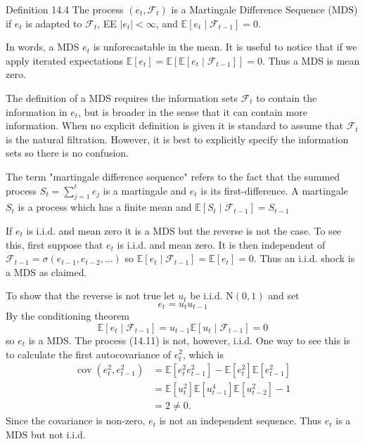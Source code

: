 \documentclass[10pt]{article}
\begin{document}
Definition 14.4 The process $\left(e_{t}, \mathscr{F}_{t}\right)$ is a Martingale Difference Sequence (MDS) if $e_{t}$ is adapted to $\mathscr{F}_{t}$, EE $\left|e_{t}\right|<\infty$, and $\mathbb{E}\left[e_{t} \mid \mathscr{F}_{t-1}\right]=0$.

In words, a MDS $e_{t}$ is unforecastable in the mean. It is useful to notice that if we apply iterated expectations $\mathbb{E}\left[e_{t}\right]=\mathbb{E}\left[\mathbb{E}\left[e_{t} \mid \mathscr{F}_{t-1}\right]\right]=0$. Thus a MDS is mean zero.

The definition of a MDS requires the information sets $\mathscr{F}_{t}$ to contain the information in $e_{t}$, but is broader in the sense that it can contain more information. When no explicit definition is given it is standard to assume that $\mathscr{F}_{t}$ is the natural filtration. However, it is best to explicitly specify the information sets so there is no confusion.

The term "martingale difference sequence" refers to the fact that the summed process $S_{t}=\sum_{j=1}^{t} e_{j}$ is a martingale and $e_{t}$ is its first-difference. A martingale $S_{t}$ is a process which has a finite mean and $\mathbb{E}\left[S_{t} \mid \mathscr{F}_{t-1}\right]=S_{t-1}$

If $e_{t}$ is i.i.d. and mean zero it is a MDS but the reverse is not the case. To see this, first suppose that $e_{t}$ is i.i.d. and mean zero. It is then independent of $\mathscr{F}_{t-1}=\sigma\left(e_{t-1}, e_{t-2}, \ldots\right)$ so $\mathbb{E}\left[e_{t} \mid \mathscr{F}_{t-1}\right]=\mathbb{E}\left[e_{t}\right]=0$. Thus an i.i.d. shock is a MDS as claimed.

To show that the reverse is not true let $u_{t}$ be i.i.d. $\mathrm{N}(0,1)$ and set
$$
e_{t}=u_{t} u_{t-1}
$$
By the conditioning theorem
$$
\mathbb{E}\left[e_{t} \mid \mathscr{F}_{t-1}\right]=u_{t-1} \mathbb{E}\left[u_{t} \mid \mathscr{F}_{t-1}\right]=0
$$
so $e_{t}$ is a MDS. The process (14.11) is not, however, i.i.d. One way to see this is to calculate the first autocovariance of $e_{t}^{2}$, which is
$$
\begin{aligned}
\operatorname{cov}\left(e_{t}^{2}, e_{t-1}^{2}\right) &=\mathbb{E}\left[e_{t}^{2} e_{t-1}^{2}\right]-\mathbb{E}\left[e_{t}^{2}\right] \mathbb{E}\left[e_{t-1}^{2}\right] \\
&=\mathbb{E}\left[u_{t}^{2}\right] \mathbb{E}\left[u_{t-1}^{4}\right] \mathbb{E}\left[u_{t-2}^{2}\right]-1 \\
&=2 \neq 0 .
\end{aligned}
$$
Since the covariance is non-zero, $e_{t}$ is not an independent sequence. Thus $e_{t}$ is a MDS but not i.i.d.
\end{document}
